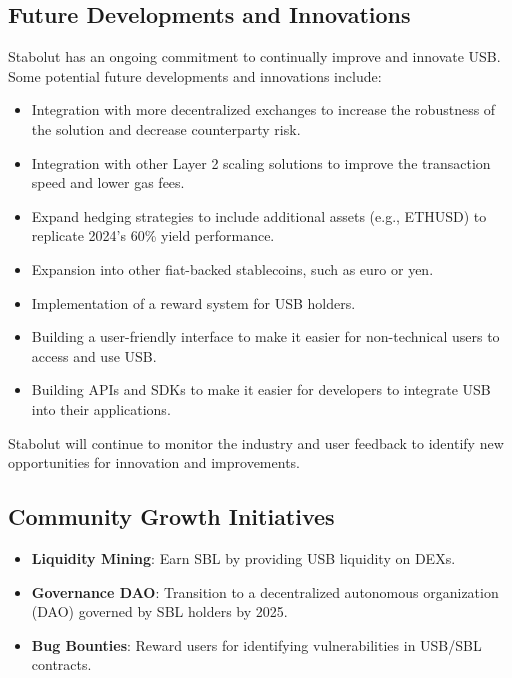\subsection{Future Developments and Innovations}
Stabolut has an ongoing commitment to continually improve and innovate USB. Some potential future developments and innovations include:
\begin{itemize}
\item Integration with more decentralized exchanges to increase the robustness of the solution and decrease counterparty risk.
\item Integration with other Layer 2 scaling solutions to improve the transaction speed and lower gas fees.
\item Expand hedging strategies to include additional assets (e.g., ETHUSD) to replicate 2024's 60\% yield performance. 
\item Expansion into other fiat-backed stablecoins, such as euro or yen.
\item Implementation of a reward system for USB holders.
\item Building a user-friendly interface to make it easier for non-technical users to access and use USB.
\item Building APIs and SDKs to make it easier for developers to integrate USB into their applications.
\end{itemize}
Stabolut will continue to monitor the industry and user feedback to identify new opportunities for innovation and improvements.

\subsection{Community Growth Initiatives}  
\begin{itemize}  
\item \textbf{Liquidity Mining}: Earn SBL by providing USB liquidity on DEXs.  
\item \textbf{Governance DAO}: Transition to a decentralized autonomous organization (DAO) governed by SBL holders by 2025.  
\item \textbf{Bug Bounties}: Reward users for identifying vulnerabilities in USB/SBL contracts.  
\end{itemize}  